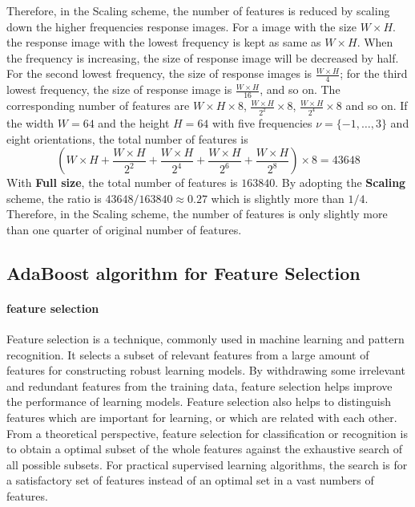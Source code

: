 Therefore, in the \mbox{Scaling} scheme, the number of features is reduced by scaling down the higher frequencies response images. For a image with the size $W\times H$. the response image with the lowest frequency is kept as same as $W\times H$. When the frequency is increasing, the size of response image will be decreased by half. For the second lowest frequency, the size of response images is $\frac{W\times H}{4}$; for the third lowest frequency, the size of response image is $\frac{W\times H}{16}$, and so on. The corresponding number of features are  $W\times H\times 8$, $\frac{W\times H}{2^2}\times 8$, $\frac{W\times H}{2^4}\times 8$ and so on. If the width $W=64$ and the height $H=64$ with five frequencies $\nu=\{-1,\ldots,3\}$ and eight orientations, the total number of features is
\begin{displaymath}
 (W\times H+ \frac{W\times H}{2^2} + \frac{W\times H}{2^4} + \frac{W\times H}{2^6}+ \frac{W\times H}{2^8})\times 8= 43648
\end{displaymath}
With \textbf{Full size}, the total number of features is $163840$. By adopting the \textbf{Scaling} scheme, the ratio is $43648/163840\approx 0.27$ which is slightly more than $1/4$. Therefore, in the Scaling scheme, the number of features is only slightly more than one quarter of original number of features.

\subsection{AdaBoost algorithm for Feature Selection}
\paragraph{feature selection}
Feature selection is a technique, commonly used in machine learning and pattern recognition. It selects a subset of relevant features from a large amount of features for constructing robust learning models. By withdrawing some irrelevant and redundant features from the training data, feature selection helps improve the performance of learning models. Feature selection also helps to distinguish features which are important for learning, or which are related with each other. From a theoretical perspective, feature selection for classification or recognition is to obtain a optimal subset of the whole features against the exhaustive search of all possible subsets. For practical supervised learning algorithms, the search is for a satisfactory set of features instead of an optimal set in a vast numbers of features. 


